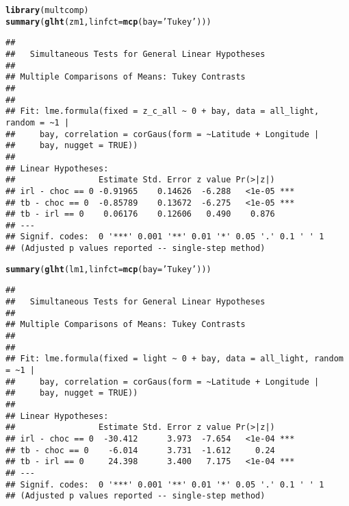 \documentclass{article}\usepackage[]{graphicx}\usepackage[]{color}
\makeatletter
\newcommand{\hlstr}[1]{\textcolor[rgb]{0.192,0.494,0.8}{#1}}%
\newcommand{\hlstd}[1]{\textcolor[rgb]{0.345,0.345,0.345}{#1}}%
\newcommand{\hlkwc}[1]{\textcolor[rgb]{0.333,0.667,0.333}{#1}}%
\newcommand{\hlkwd}[1]{\textcolor[rgb]{0.737,0.353,0.396}{\textbf{#1}}}%
\newenvironment{kframe}{%
 \def\at@end@of@kframe{}%
 \ifinner\ifhmode%
  \def\at@end@of@kframe{\end{minipage}}%
  \begin{minipage}{\columnwidth}%
 \fi\fi%
 \def\FrameCommand##1{\hskip\@totalleftmargin \hskip-\fboxsep
 \colorbox{shadecolor}{##1}\hskip-\fboxsep
     \hskip-\linewidth \hskip-\@totalleftmargin \hskip\columnwidth}%
 \MakeFramed {\advance\hsize-\width
   \@totalleftmargin\z@ \linewidth\hsize
   \@setminipage}}%
 {\par\unskip\endMakeFramed%
 \at@end@of@kframe}
\newenvironment{knitrout}{}{} %
\makeatother
\begin{document}
\begin{knitrout}
\color{fgcolor}\begin{kframe}
\begin{alltt}
\hlkwd{library}\hlstd{(multcomp)}
\hlkwd{summary}\hlstd{(}\hlkwd{glht}\hlstd{(zm1,} \hlkwc{linfct} \hlstd{=} \hlkwd{mcp}\hlstd{(}\hlkwc{bay} \hlstd{=} \hlstr{'Tukey'}\hlstd{)))}
\end{alltt}
\begin{verbatim}
## 
## 	 Simultaneous Tests for General Linear Hypotheses
## 
## Multiple Comparisons of Means: Tukey Contrasts
## 
## 
## Fit: lme.formula(fixed = z_c_all ~ 0 + bay, data = all_light, random = ~1 | 
##     bay, correlation = corGaus(form = ~Latitude + Longitude | 
##     bay, nugget = TRUE))
## 
## Linear Hypotheses:
##                 Estimate Std. Error z value Pr(>|z|)    
## irl - choc == 0 -0.91965    0.14626  -6.288   <1e-05 ***
## tb - choc == 0  -0.85789    0.13672  -6.275   <1e-05 ***
## tb - irl == 0    0.06176    0.12606   0.490    0.876    
## ---
## Signif. codes:  0 '***' 0.001 '**' 0.01 '*' 0.05 '.' 0.1 ' ' 1
## (Adjusted p values reported -- single-step method)
\end{verbatim}
\begin{alltt}
\hlkwd{summary}\hlstd{(}\hlkwd{glht}\hlstd{(lm1,} \hlkwc{linfct} \hlstd{=} \hlkwd{mcp}\hlstd{(}\hlkwc{bay} \hlstd{=} \hlstr{'Tukey'}\hlstd{)))}
\end{alltt}
\begin{verbatim}
## 
## 	 Simultaneous Tests for General Linear Hypotheses
## 
## Multiple Comparisons of Means: Tukey Contrasts
## 
## 
## Fit: lme.formula(fixed = light ~ 0 + bay, data = all_light, random = ~1 | 
##     bay, correlation = corGaus(form = ~Latitude + Longitude | 
##     bay, nugget = TRUE))
## 
## Linear Hypotheses:
##                 Estimate Std. Error z value Pr(>|z|)    
## irl - choc == 0  -30.412      3.973  -7.654   <1e-04 ***
## tb - choc == 0    -6.014      3.731  -1.612     0.24    
## tb - irl == 0     24.398      3.400   7.175   <1e-04 ***
## ---
## Signif. codes:  0 '***' 0.001 '**' 0.01 '*' 0.05 '.' 0.1 ' ' 1
## (Adjusted p values reported -- single-step method)
\end{verbatim}
\end{kframe}
\end{knitrout}
\end{document}
